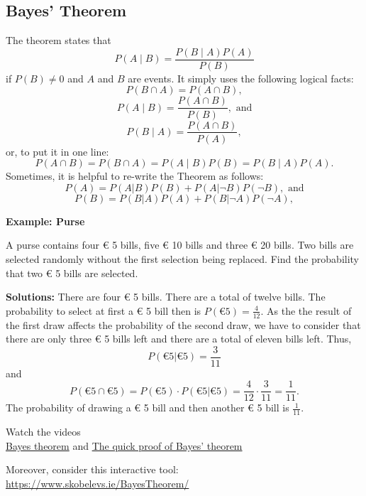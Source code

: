 \documentclass[
  12pt,
  oneside]{book}
\theoremstyle{definition}
\theoremstyle{definition}
\theoremstyle{definition}
\theoremstyle{definition}
\theoremstyle{remark}
\begin{document}
\hypertarget{bayes-theorem}{%
\subsection{Bayes' Theorem}\label{bayes-theorem}}

The theorem states that
\[P(A\mid B)={\frac {P(B\mid A)P(A)}{P(B)}} \]
if \(P(B)\neq 0\) and \(A\) and \(B\) are events. It simply uses the following logical facts:
\[P(B\cap A)=P(A\cap B),\]
\[P(A\mid B)=\frac {P(A\cap B)}{P(B)},  \text{ and}\]
\[P(B\mid A)=\frac {P(A\cap B)}{P(A)},\]
or, to put it in one line:
\[  P(A\cap B)= P(B\cap A)=P(A\mid B)P(B)=P(B\mid A)P(A).   \]
Sometimes, it is helpful to re-write the Theorem as follows:
\[P(A)=P(A|B)P(B)+P(A|\neg B)P(\neg B),  \text{ and}\]
\[P(B)=P(B|A)P(A)+P(B|\neg A)P(\neg A),\]

\textbf{Example: Purse}

A purse contains four € 5 bills, five € 10 bills and three € 20 bills. Two bills are selected randomly without the first selection being replaced. Find the probability that two € 5 bills are selected.

\textbf{Solutions:} There are four € 5 bills. There are a total of twelve bills.
The probability to select at first a € 5 bill then is \(P(€ 5) = \frac{4}{12}\).
As the the result of the first draw affects the probability of the second draw, we have to consider that there are only three € 5 bills left and there are a total of eleven bills left. Thus,
\[
P(€ 5 | € 5)=\frac{3}{11}
\]
and
\[
P(€ 5 \cap € 5) = P(€ 5) \cdot P(€ 5 | € 5) = \frac{4}{12} \cdot \frac{3}{11}=\frac{1}{11}.
\]
The probability of drawing a € 5 bill and then another € 5 bill is \(\frac{1}{11}\).

Watch the videos\\
\href{https://youtu.be/HZGCoVF3YvM}{Bayes theorem} and
\href{https://youtu.be/U_85TaXbeIo}{The quick proof of Bayes' theorem}

Moreover, consider this interactive tool: \url{https://www.skobelevs.ie/BayesTheorem/}
\end{document}
